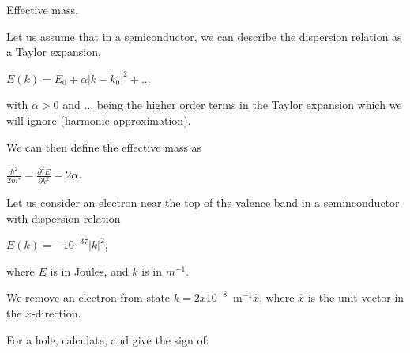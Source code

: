 \documentclass{oxmathproblems}
\begin{document}
\begin{questions}
\begin{solution}
\end{solution}
  

\miquestion
Effective mass. 

Let us assume that in a semiconductor, we can describe the dispersion relation
as a Taylor expansion,

$E(k)=E_0 + \alpha |k-k_0|^2 + ...$

with $\alpha>0$ and $...$ being the higher order terms in the Taylor expansion
which we will ignore (harmonic approximation). 

We can then define the effective mass as

$\frac{\hbar^2}{2m^*} = \frac{\partial^2 E}{\partial k^2} = 2\alpha$.

Let us consider an electron near the top of the valence band in
a seminconductor with dispersion relation

    $E(k)=-10^{-37} |k|^2$,

where $E$ is in Joules, and $k$ is in $m^{-1}$. 

We remove an electron from state $k=2x10^{-8}$~m$^{-1} \hat x$, where $\hat x$ is
the unit vector in the $x$-direction. 

For a hole, calculate, and give the sign of:

\end{questions}
\end{document}
